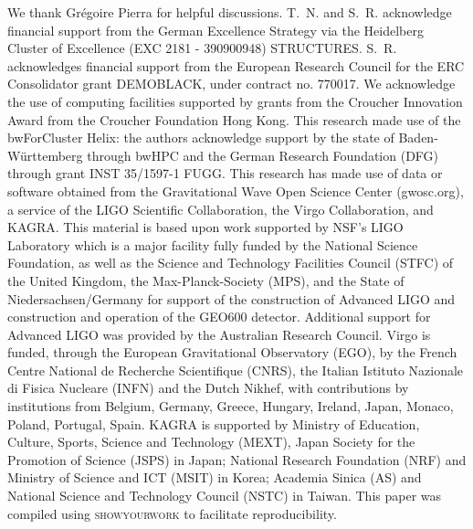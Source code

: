 \documentclass[sn-aps, pdflatex, iicol]{sn-jnl}
\begin{document}
We thank Grégoire Pierra for helpful discussions.
T.~N. and S.~R. acknowledge financial support from the German Excellence Strategy via the Heidelberg Cluster of Excellence (EXC 2181 - 390900948) STRUCTURES.
S.~R. acknowledges financial support from the European Research Council for the ERC Consolidator grant DEMOBLACK, under contract no. 770017. 
We acknowledge the use of computing facilities supported by grants from the Croucher Innovation Award from the Croucher Foundation Hong Kong.
This research made use of the bwForCluster Helix: the authors acknowledge support by the state of Baden-Württemberg through bwHPC and the German Research Foundation (DFG) through grant INST 35/1597-1 FUGG.
This research has made use of data or software obtained from the Gravitational Wave Open Science Center (gwosc.org), a service of the LIGO Scientific Collaboration, the Virgo Collaboration, and KAGRA. This material is based upon work supported by NSF's LIGO Laboratory which is a major facility fully funded by the National Science Foundation, as well as the Science and Technology Facilities Council (STFC) of the United Kingdom, the Max-Planck-Society (MPS), and the State of Niedersachsen/Germany for support of the construction of Advanced LIGO and construction and operation of the GEO600 detector. Additional support for Advanced LIGO was provided by the Australian Research Council. Virgo is funded, through the European Gravitational Observatory (EGO), by the French Centre National de Recherche Scientifique (CNRS), the Italian Istituto Nazionale di Fisica Nucleare (INFN) and the Dutch Nikhef, with contributions by institutions from Belgium, Germany, Greece, Hungary, Ireland, Japan, Monaco, Poland, Portugal, Spain. KAGRA is supported by Ministry of Education, Culture, Sports, Science and Technology (MEXT), Japan Society for the Promotion of Science (JSPS) in Japan; National Research Foundation (NRF) and Ministry of Science and ICT (MSIT) in Korea; Academia Sinica (AS) and National Science and Technology Council (NSTC) in Taiwan.
This paper was compiled using \textsc{showyourwork} \cite{Luger2021} to facilitate reproducibility.


\end{document}
